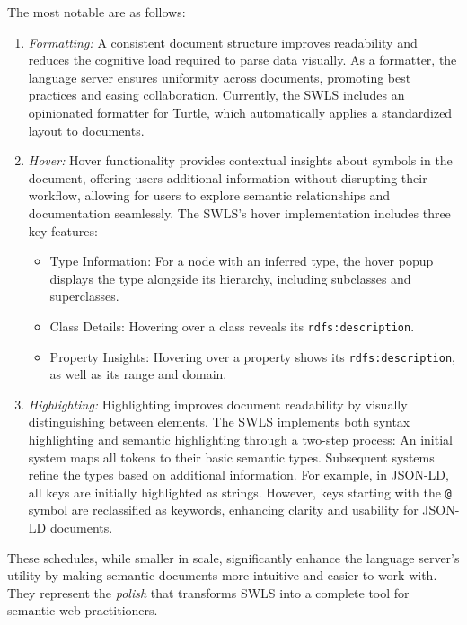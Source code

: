 The most notable are as follows:
\begin{enumerate}
  \item \textit{Formatting:}
    A consistent document structure improves readability and reduces the cognitive load required to parse data visually.
    As a formatter, the language server ensures uniformity across documents, promoting best practices and easing collaboration.
    Currently, the SWLS includes an opinionated formatter for Turtle, which automatically applies a standardized layout to documents.

  \item \textit{Hover:}
    Hover functionality provides contextual insights about symbols in the document, offering users additional information without disrupting their workflow,
    allowing for users to explore semantic relationships and documentation seamlessly.
    The SWLS’s hover implementation includes three key features:
    \begin{itemize}
      \item Type Information: For a node with an inferred type, the hover popup displays the type alongside its hierarchy, including subclasses and superclasses.
      \item Class Details: Hovering over a class reveals its \texttt{rdfs:description}.
      \item Property Insights: Hovering over a property shows its \texttt{rdfs:description}, as well as its range and domain.
    \end{itemize}

  \item \textit{Highlighting:}
    Highlighting improves document readability by visually distinguishing between elements.
    The SWLS implements both syntax highlighting and semantic highlighting through a two-step process:
        An initial system maps all tokens to their basic semantic types.
        Subsequent systems refine the types based on additional information.
    For example, in JSON-LD, all keys are initially highlighted as strings.
    However, keys starting with the \texttt{@} symbol are reclassified as keywords, enhancing clarity and usability for JSON-LD documents.
\end{enumerate}

These schedules, while smaller in scale, significantly enhance the language server’s utility by making semantic documents more intuitive and easier to work with.
They represent the \textit{polish} that transforms SWLS into a complete tool for semantic web practitioners.
